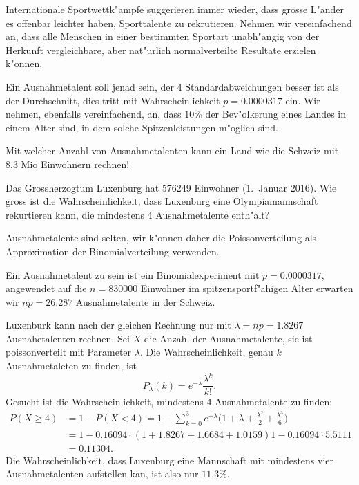 Internationale Sportwettk"ampfe suggerieren immer wieder, dass grosse
L"ander es offenbar leichter haben, Sporttalente zu rekrutieren.
Nehmen wir vereinfachend an, dass alle Menschen in einer
bestimmten Sportart unabh"angig von der Herkunft vergleichbare,
aber nat"urlich normalverteilte Resultate erzielen k"onnen.

Ein Ausnahmetalent soll jenad sein, der 4 Standardabweichungen besser ist
als der Durchschnitt, dies tritt mit Wahrscheinlichkeit $p = 0.0000317$ ein.
Wir nehmen, ebenfalls vereinfachend, an, dass $10\%$ der Bev"olkerung
eines Landes in einem Alter sind, in dem solche Spitzenleistungen
m"oglich sind.
\begin{teilaufgaben}
\item
Mit welcher Anzahl von Ausnahmetalenten kann ein Land wie die Schweiz mit 
8.3 Mio Einwohnern rechnen!
\item
Das Grossherzogtum Luxenburg hat 576249 Einwohner (1.~Januar 2016).
Wie gross ist die Wahrscheinlichkeit, dass Luxenburg eine Olympiamannschaft
rekurtieren kann, die mindestens 4 Ausnahmetalente enth"alt?
\end{teilaufgaben}

\begin{loesung}
Ausnahmetalente sind selten, wir k"onnen daher die Poissonverteilung als
Approximation der Binomialverteilung verwenden.
\begin{teilaufgaben}
\item
Ein Ausnahmetalent zu sein ist ein Binomialexperiment mit $p=0.0000317$,
angewendet auf die $n=830000$ Einwohner im spitzensportf"ahigen Alter
erwarten wir $np=26.287$ Ausnahmetalente in der Schweiz.
\item
Luxenburk kann nach der gleichen Rechnung nur mit $\lambda=np=1.8267$
Ausnahetalenten rechnen.
Sei $X$ die Anzahl der Ausnahmetalente, sie ist poissonverteilt mit
Parameter $\lambda$.
Die Wahrscheinlichkeit, genau $k$ Ausnahmetaleten zu finden, ist
\[
P_\lambda(k)=e^{-\lambda}\frac{\lambda^k}{k!}.
\]
Gesucht ist die Wahrscheinlichkeit, mindestens 4 Ausnahmetalente zu finden:
\begin{align*}
P(X \ge 4)
&=
1-P(X<4)=1-\sum_{k=0}^3 e^{-\lambda}\biggl(
1+\lambda+ \frac{\lambda^2}{2} + \frac{\lambda^3}{6}
\biggr)
\\
&=
1-0.16094\cdot(1+1.8267+1.6684+1.0159)1-0.16094\cdot 5.5111\\
&=
0.11304.
\end{align*}
Die Wahrscheinlichkeit, dass Luxenburg eine Mannschaft mit mindestens
vier Ausnahmetalenten aufstellen kan, ist also nur $11.3\%$.
\end{teilaufgaben}
\end{loesung}

\begin{bewertung}
\end{bewertung}

